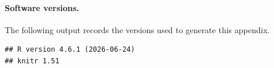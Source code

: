 \paragraph{Software versions.}
The following output records the versions used to generate this appendix.

\begin{knitrout}
\color{fgcolor}\begin{kframe}
\begin{verbatim}
## R version 4.6.1 (2026-06-24) 
## knitr 1.51
\end{verbatim}
\end{kframe}
\end{knitrout}
